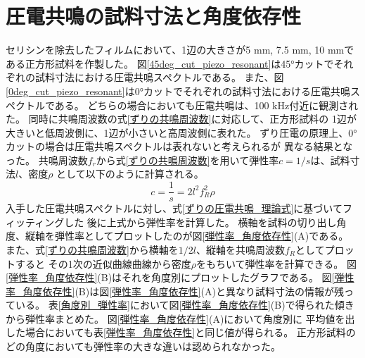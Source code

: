 \documentclass[dvipdfmx,12pt,a4paper]{jreport}
\begin{document}
		\section{圧電共鳴の試料寸法と角度依存性}
		セリシンを除去したフィルムにおいて、1辺の大きさが5 mm, 7.5 mm, 10 mmである正方形試料を作製した。
		図\ref{45deg_cut_piezo_resonant}は45°カットでそれぞれの試料寸法における圧電共鳴スペクトルである。
		また、図\ref{0deg_cut_piezo_resonant}は0°カットでそれぞれの試料寸法における圧電共鳴スペクトルである。
		どちらの場合においても圧電共鳴は、100 kHz付近に観測された。
		同時に共鳴周波数の式\eqref{ずりの共鳴周波数}に対応して、正方形試料の
		1辺が大きいと低周波側に、1辺が小さいと高周波側に表れた。
		ずり圧電の原理上、0°カットの場合は圧電共鳴スペクトルは表れないと考えられるが
		異なる結果となった。
		共鳴周波数$f_r$から式\eqref{ずりの共鳴周波数}を用いて弾性率$c=1/s$は、試料寸法$l$、密度$\rho$
		として以下のように計算される。
		\begin{equation}
			c = \frac{1}{s} = 2l^2 f_R^2 \rho
		\end{equation}
		入手した圧電共鳴スペクトルに対し、式\eqref{ずりの圧電共鳴_理論式}に基づいてフィッティングした
		後に上式から弾性率を計算した。
		横軸を試料の切り出し角度、縦軸を弾性率としてプロットしたのが図\ref{弾性率_角度依存性}(A)である。
		また、式\eqref{ずりの共鳴周波数}から横軸を$1/2l$、縦軸を共鳴周波数$f_R$としてプロットすると
		その1次の近似曲線曲線から密度$\rho$をもちいて弾性率を計算できる。
		図\ref{弾性率_角度依存性}(B)はそれを角度別にプロットしたグラフである。
		図\ref{弾性率_角度依存性}(B)は図\ref{弾性率_角度依存性}(A)と異なり試料寸法の情報が残っている。
		表\ref{角度別_弾性率}において図\ref{弾性率_角度依存性}(B)で得られた傾きから弾性率まとめた。
		図\ref{弾性率_角度依存性}(A)において角度別に
		平均値を出した場合においても表\ref{弾性率_角度依存性}と同じ値が得られる。
		正方形試料のどの角度においても弾性率の大きな違いは認められなかった。
\end{document}
